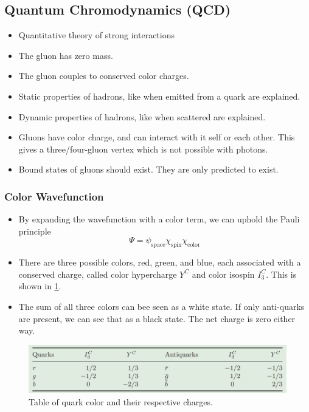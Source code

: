 \subsection{Quantum Chromodynamics (QCD)}
\begin{itemize}
    \item Quantitative theory of strong interactions 
    \item The gluon has zero mass. 
    \item The gluon couples to conserved color charges. 
    \item Static properties of hadrons, like when emitted from a quark are explained. 
    \item Dynamic properties of hadrons, like when scattered are explained.     
    \item Gluons have color charge, and can interact with it self or each other. This gives a three/four-gluon vertex which is not possible with photons.
    \item Bound states of gluons should exist. They are only predicted to exist. 
\end{itemize}

\subsubsection{Color Wavefunction}
\begin{itemize}
    \item By expanding the wavefunction with a color term, we can uphold the Pauli principle
    \begin{equation}
      Ψ = ψ_{\text{space}}  χ_{\text{spin}} χ_{\text{color}}
    \end{equation} 
    \item There are three possible colors, red, green, and blue, each associated with a conserved charge, called color hypercharge $Y^{C}$ and color isospin $I_3^{C}$. This is shown in \cref{fig: color_numbers}. 
    \item The sum of all three colors can bee seen as a white state. If only anti-quarks are present, we can see that as a black state. The net charge is zero either way. 
\end{itemize}

\begin{figure}[h!]
\centering
\includegraphics[width = \textwidth]{color_numbers.png}
\caption{Table of quark color and their respective charges. }
\label{fig: color_numbers}
\end{figure}
